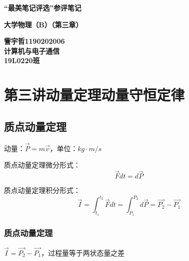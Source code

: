\documentclass[UTF8]{article}
\begin{document}
\newpage

    \thispagestyle{empty}
    \begin{center}
    \parbox[t][1cm][t]{\textwidth}{
    \begin{center}  \end{center} }

    \parbox[t][1cm][c]{\textwidth}{\large
    \begin{center} {\textbf{\textsf \mbox{“最美笔记评选”参评笔记}}}\end{center} }

    \parbox[t][9cm][c]{\textwidth}{\huge
    \begin{center} {\textbf{\textsf \mbox{大学物理（B）（第三章）} }}\end{center} }

    \parbox[t][1cm][t]{\textwidth}{
    \begin{center}  \end{center} }

    \parbox[t][5cm][b]{\textwidth}{
    \begin{center} {\large \textsf{\textbf{訾宇哲1190202006\\
            计算机与电子通信\\ 19L0220班\\} }} \end{center} }
        \end{center}

\newpage
\tableofcontents
\newpage
\section{第三讲\;\;动量定理\;\;动量守恒定律}
\subsection{质点动量定理}

    动量：$\vec{P} = m\vec{v}$，单位：$kg\cdot m/s$
    
    质点动量定理微分形式：\[\vec{F}dt = d\vec{P}\]

    质点动量定理积分形式：\[\vec{I} = \int_{t_1}^{t_2}\vec{F}dt = \int_{P_1}^{P_2}d\vec{P} = \vec{P_2} - \vec{P_1}\]

\subsubsection{质点动量定理}

    $\vec{I} = \vec{P_2} - \vec{P_1}$，过程量等于两状态量之差
\end{document}
